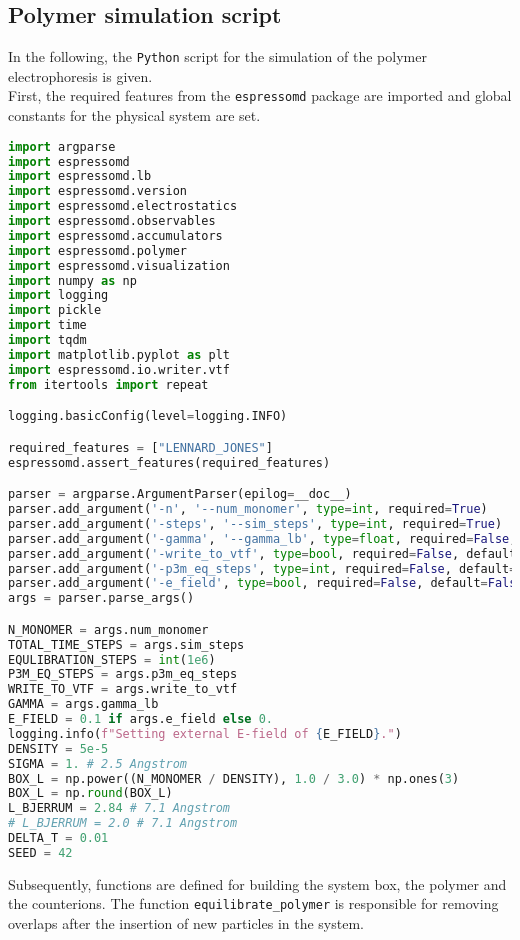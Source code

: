 
\lstset{basicstyle=\footnotesize\ttfamily, breaklines=true}
\subsection{Polymer simulation script}
In the following, the \texttt{Python} script for the simulation of the polymer electrophoresis is given. \\
First, the required features from the \texttt{espressomd} package are imported and global constants for the physical system are set. 
\begin{lstlisting}[language=python]
import argparse
import espressomd
import espressomd.lb
import espressomd.version
import espressomd.electrostatics
import espressomd.observables
import espressomd.accumulators
import espressomd.polymer
import espressomd.visualization
import numpy as np
import logging
import pickle
import time
import tqdm
import matplotlib.pyplot as plt
import espressomd.io.writer.vtf
from itertools import repeat

logging.basicConfig(level=logging.INFO)

required_features = ["LENNARD_JONES"]
espressomd.assert_features(required_features)

parser = argparse.ArgumentParser(epilog=__doc__)
parser.add_argument('-n', '--num_monomer', type=int, required=True)
parser.add_argument('-steps', '--sim_steps', type=int, required=True)
parser.add_argument('-gamma', '--gamma_lb', type=float, required=False, default=20.)
parser.add_argument('-write_to_vtf', type=bool, required=False, default=False)
parser.add_argument('-p3m_eq_steps', type=int, required=False, default=1000000)
parser.add_argument('-e_field', type=bool, required=False, default=False)
args = parser.parse_args()

N_MONOMER = args.num_monomer
TOTAL_TIME_STEPS = args.sim_steps
EQULIBRATION_STEPS = int(1e6)
P3M_EQ_STEPS = args.p3m_eq_steps
WRITE_TO_VTF = args.write_to_vtf
GAMMA = args.gamma_lb
E_FIELD = 0.1 if args.e_field else 0.
logging.info(f"Setting external E-field of {E_FIELD}.")
DENSITY = 5e-5
SIGMA = 1. # 2.5 Angstrom
BOX_L = np.power((N_MONOMER / DENSITY), 1.0 / 3.0) * np.ones(3)
BOX_L = np.round(BOX_L)
L_BJERRUM = 2.84 # 7.1 Angstrom
# L_BJERRUM = 2.0 # 7.1 Angstrom
DELTA_T = 0.01
SEED = 42
\end{lstlisting}
Subsequently, functions are defined for building the system box, the polymer and the counterions. The function \texttt{equilibrate\_polymer} is responsible for removing overlaps after the insertion of new particles in the system.
